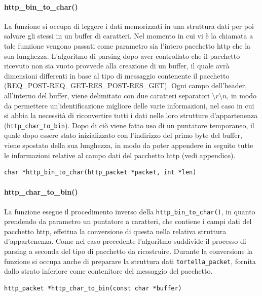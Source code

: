 \paragraph{http\_bin\_to\_char()}
La funzione si occupa di leggere i dati memorizzati in una struttura dati per poi salvare gli stessi in un buffer di caratteri. Nel momento in cui vi è la chiamata a tale funzione vengono passati come parametro sia l'intero pacchetto http che la sua lunghezza. L'algoritmo di parsing dopo aver controllato che il pacchetto ricevuto non sia vuoto provvede alla creazione di un buffer, il quale avrà dimensioni differenti  in base al tipo di messaggio contenente il pacchetto (REQ\_POST-REQ\_GET-RES\_POST-RES\_GET). Ogni campo dell'header, all'interno del buffer, viene delimitato con due caratteri separatori \texttt{$\setminus r\setminus n$}, in modo da permettere un'identificazione migliore delle varie informazioni, nel caso in cui si abbia la necessità di riconvertire tutti i dati nelle loro strutture d'appartenenza (\texttt{http\_char\_to\_bin}). Dopo di ciò viene fatto uso di un puntatore temporaneo, il quale dopo essere stato inizializzato con l'indirizzo del primo byte del buffer, viene spostato della sua lunghezza, in modo da poter appendere in seguito tutte le informazioni relative al campo dati del pacchetto http (vedi appendice).
\begin{lstlisting}
char *http_bin_to_char(http_packet *packet, int *len)
\end{lstlisting}
\paragraph{http\_char\_to\_bin()}
La funzione esegue il procedimento inverso della \texttt{http\_bin\_to\_char()}, in quanto prendendo da parametro un puntatore a caratteri, che contiene i campi dati del pacchetto http, effettua la conversione di questa nella relativa struttura d'appartenenza. Come nel caso precedente l'algoritmo suddivide il processo di parsing a seconda del tipo di pacchetto da ricostruire. Durante la conversione la funzione si occupa anche di preparare la struttura dati \texttt{tortella\_packet}, fornita dallo strato inferiore come contenitore del messaggio del pacchetto.
\begin{lstlisting}
http_packet *http_char_to_bin(const char *buffer)
\end{lstlisting}
